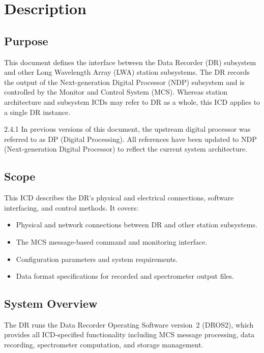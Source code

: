 
\chapter{Description}
\label{sec:description}

\section{Purpose}

This document defines the interface between the Data Recorder (DR) subsystem and
other Long Wavelength Array (LWA) station subsystems.  The DR records the output
of the Next-generation Digital Processor (NDP) subsystem and is controlled by the
Monitor and Control System (MCS).  Whereas station architecture and subsystem ICDs
may refer to DR as a whole, this ICD applies to a single DR instance.

\begin{newInVersion}{2.4.1}
In previous versions of this document, the upstream digital processor was referred
to as DP (Digital Processing).  All references have been updated to NDP
(Next-generation Digital Processor) to reflect the current system architecture.
\end{newInVersion}

\section{Scope}

This ICD describes the DR's physical and electrical connections, software
interfacing, and control methods.  It covers:
\begin{itemize}
    \item Physical and network connections between DR and other station subsystems.
    \item The MCS message-based command and monitoring interface.
    \item Configuration parameters and system requirements.
    \item Data format specifications for recorded and spectrometer output files.
\end{itemize}

\section{System Overview}

The DR runs the Data Recorder Operating Software version~2 (DROS2), which
provides all ICD-specified functionality including MCS message processing,
data recording, spectrometer computation, and storage management.

